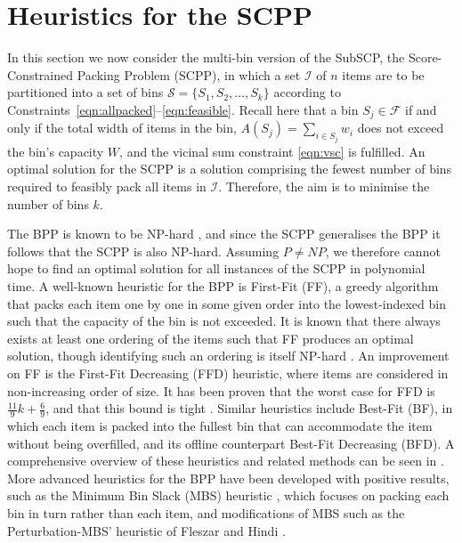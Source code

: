 \documentclass[a4paper,11pt,authoryear]{elsarticle}
\begin{document}
\section{Heuristics for the SCPP}
\label{sec:heur}
\noindent In this section we now consider the multi-bin version of the SubSCP, the Score-Constrained Packing Problem (SCPP), in which a set $\mathcal{I}$ of $n$ items are to be partitioned into a set of bins $\mathcal{S} = \{S_1, S_2,\dotsc,S_k\}$ according to Constraints~\eqref{eqn:allpacked}--\eqref{eqn:feasible}. Recall here that a bin $S_j \in \mathcal{F}$ if and only if the total width of items in the bin, $A(S_j) = \sum_{i \in S_j} w_i$ does not exceed the bin's capacity $W$, and the vicinal sum constraint \eqref{eqn:vsc} is fulfilled. An optimal solution for the SCPP is a solution comprising the fewest number of bins required to feasibly pack all items in $\mathcal{I}$. Therefore, the aim is to minimise the number of bins $k$.

The BPP is known to be NP-hard \cite{garey1979}, and since the SCPP generalises the BPP it follows that the SCPP is also NP-hard. Assuming $P \neq NP$, we therefore cannot hope to find an optimal solution for all instances of the SCPP in polynomial time. A well-known heuristic for the BPP is First-Fit (FF), a greedy algorithm that packs each item one by one in some given order into the lowest-indexed bin such that the capacity of the bin is not exceeded. It is known that there always exists at least one ordering of the items such that FF produces an optimal solution, though identifying such an ordering is itself NP-hard  \cite{lewis2009}. An improvement on FF is the First-Fit Decreasing (FFD) heuristic, where items are considered in non-increasing order of size. It has been proven that the worst case for FFD is $\frac{11}{9}k + \frac{6}{9}$, and that this bound is tight \cite{dosa2007}. Similar heuristics include Best-Fit (BF), in which each item is packed into the fullest bin that can accommodate the item without being overfilled, and its offline counterpart Best-Fit Decreasing (BFD). A comprehensive overview of these heuristics and related methods can be seen in \cite{coffman1984}. More advanced heuristics for the BPP have been developed with positive results, such as the Minimum Bin Slack (MBS) heuristic \cite{gupta1999}, which focuses on packing each bin in turn rather than each item, and modifications of MBS such as the Perturbation-MBS' heuristic of Fleszar and Hindi \cite{fleszar2002}. 
\end{document}
